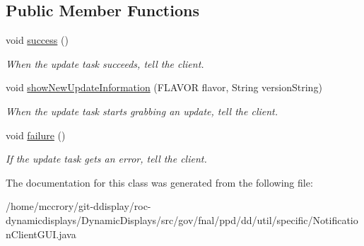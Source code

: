\subsection*{Public Member Functions}
\begin{DoxyCompactItemize}
\item 
\hypertarget{classgov_1_1fnal_1_1ppd_1_1dd_1_1util_1_1specific_1_1NotificationClientGUI_a4b11dc1662b8cd3e6b4816a60adc2000}{void \hyperlink{classgov_1_1fnal_1_1ppd_1_1dd_1_1util_1_1specific_1_1NotificationClientGUI_a4b11dc1662b8cd3e6b4816a60adc2000}{success} ()}\label{classgov_1_1fnal_1_1ppd_1_1dd_1_1util_1_1specific_1_1NotificationClientGUI_a4b11dc1662b8cd3e6b4816a60adc2000}

\begin{DoxyCompactList}\small\item\em When the update task succeeds, tell the client. \end{DoxyCompactList}\item 
\hypertarget{classgov_1_1fnal_1_1ppd_1_1dd_1_1util_1_1specific_1_1NotificationClientGUI_a373fcb7ff3d7811e0113ec46ad361208}{void \hyperlink{classgov_1_1fnal_1_1ppd_1_1dd_1_1util_1_1specific_1_1NotificationClientGUI_a373fcb7ff3d7811e0113ec46ad361208}{show\-New\-Update\-Information} (F\-L\-A\-V\-O\-R flavor, String version\-String)}\label{classgov_1_1fnal_1_1ppd_1_1dd_1_1util_1_1specific_1_1NotificationClientGUI_a373fcb7ff3d7811e0113ec46ad361208}

\begin{DoxyCompactList}\small\item\em When the update task starts grabbing an update, tell the client. \end{DoxyCompactList}\item 
\hypertarget{classgov_1_1fnal_1_1ppd_1_1dd_1_1util_1_1specific_1_1NotificationClientGUI_a461ff133d0a5f8b53a65c84181a2c631}{void \hyperlink{classgov_1_1fnal_1_1ppd_1_1dd_1_1util_1_1specific_1_1NotificationClientGUI_a461ff133d0a5f8b53a65c84181a2c631}{failure} ()}\label{classgov_1_1fnal_1_1ppd_1_1dd_1_1util_1_1specific_1_1NotificationClientGUI_a461ff133d0a5f8b53a65c84181a2c631}

\begin{DoxyCompactList}\small\item\em If the update task gets an error, tell the client. \end{DoxyCompactList}\end{DoxyCompactItemize}


The documentation for this class was generated from the following file\-:\begin{DoxyCompactItemize}
\item 
/home/mccrory/git-\/ddisplay/roc-\/dynamicdisplays/\-Dynamic\-Displays/src/gov/fnal/ppd/dd/util/specific/Notification\-Client\-G\-U\-I.\-java\end{DoxyCompactItemize}
